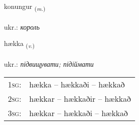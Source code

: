 \documentclass[frontgrid, backgrid]{flacards}\usepackage[]{graphicx}\usepackage[]{xcolor}
\begin{document}
\renewcommand{\flhead}{\vskip5pt \fboxsep=0pt {\small\bfseries\footnotesize Nafnorð | іменник}}
\renewcommand{\fcfoot}{\vskip5pt \fboxsep=0pt \hspace{2pt}{\small\bfseries\footnotesize 1K}}

\renewcommand{\blhead}{\vskip5pt {\small\bfseries\footnotesize Nafnorð | іменник }}
\renewcommand{\bcfoot}{\vskip5pt \hspace{2pt}{\small\bfseries\footnotesize 1K}}


{konungur \small{\textsubscript{(\textit{m.})}} \\[1ex] %
\textphonetic{[kʰɔːnuŋkʏr]} \\
ukr.: \emph{король} \\  [2ex]
\renewcommand*{\arraystretch}{0.8}
}

\renewcommand{\flhead}{\vskip5pt \fboxsep=0pt {\small\bfseries\footnotesize Sagnorð | дієслово}}
\renewcommand{\fcfoot}{\vskip5pt \fboxsep=0pt \hspace{2pt}{\small\bfseries\footnotesize 1K}}

\renewcommand{\blhead}{\vskip5pt {\small\bfseries\footnotesize Sagnorð | дієслово }}
\renewcommand{\bcfoot}{\vskip5pt \hspace{2pt}{\small\bfseries\footnotesize 1K}}


{hækka \small{\textsubscript{(\textit{v.})}} \\[1ex] %
\textphonetic{[haihka]} \\
ukr.: \emph{підвищувати; підіймати} \\  [2ex]
\renewcommand*{\arraystretch}{0.8}
\begin{tabular}{p{1cm}l}
\textsc{1sg}: & hækka -- hækkaði -- hækkað \\ 
\textsc{2sg}: & hækkar -- hækkaðir -- hækkað \\ 
\textsc{3sg}: & hækkar -- hækkaði -- hækkað \\ 
\end{tabular}
}
\end{document}
